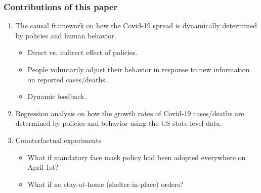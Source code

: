 \documentclass{beamer}
\begin{document}
\begin{frame}
  \frametitle{Contributions of this paper}\vspace{-0.05cm}
 
 \begin{enumerate}
 \item The causal framework on how the Covid-19 spread  is dynamically determined by policies and human behavior.  \smallskip
 \begin{itemize}
 \item Direct  vs. indirect effect of policies.
 \item People voluntarily adjust their behavior in response to new information on reported cases/deaths.
 \item Dynamic feedback. \smallskip
 \end{itemize}
 \item Regression analysis on how the growth rates of  Covid-19 cases/deaths are determined by policies and behavior using the US state-level data.  \smallskip
 \item Counterfactual experiments \smallskip
 \begin{itemize}
 \item What if mandatory face mask policy had been adopted everywhere on April 1st? \smallskip
 \item What if no stay-at-home (shelter-in-place) orders?
 \end{itemize}
 \end{enumerate}

\end{frame}


 


\end{document}
